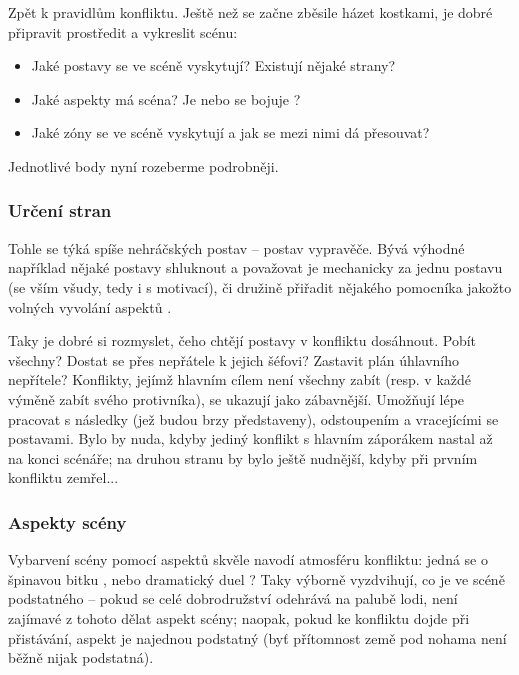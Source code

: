 \documentclass[../main.tex]{subfiles}
\begin{document}
Zpět k pravidlům konfliktu. Ještě než se začne zběsile házet kostkami, je dobré připravit
prostředit a vykreslit scénu:

\begin{itemize}
  \item Jaké postavy se ve scéně vyskytují? Existují nějaké strany?
  \item Jaké aspekty má scéna? Je  nebo se bojuje
    ?
  \item Jaké zóny se ve scéně vyskytují a jak se mezi nimi dá přesouvat?
\end{itemize}

Jednotlivé body nyní rozeberme podrobněji.

\subsubsection{Určení stran}
\label{sec:urcenistran}
Tohle se týká spíše nehráčských postav – postav vypravěče. Bývá výhodné například nějaké
postavy shluknout a považovat je mechanicky za jednu postavu (se vším všudy, tedy i s
motivací), či družině přiřadit nějakého pomocníka jakožto volných vyvolání aspektů .

Taky je dobré si rozmyslet, čeho chtějí postavy v konfliktu dosáhnout. Pobít všechny?
Dostat se přes nepřátele k jejich šéfovi? Zastavit plán úhlavního nepřítele? Konflikty,
jejímž hlavním cílem není všechny zabít (resp. v každé výměně zabít svého protivníka), se
ukazují jako zábavnější. Umožňují lépe pracovat s následky (jež budou brzy představeny),
odstoupením a vracejícími se postavami. Bylo by nuda, kdyby jediný konflikt s hlavním
záporákem nastal až na konci scénáře; na druhou stranu by bylo ještě nudnější, kdyby při
prvním konfliktu zemřel...

\subsubsection{Aspekty scény}
\label{sec:aspektysceny}

Vybarvení scény pomocí aspektů skvěle navodí atmosféru konfliktu: jedná se o špinavou
bitku , nebo dramatický duel ? Taky výborně
vyzdvihují, co je ve scéně podstatného – pokud se celé dobrodružství odehrává na palubě
lodi, není zajímavé z tohoto dělat aspekt scény; naopak, pokud ke konfliktu dojde při
přistávání, aspekt  je najednou podstatný (byť přítomnost země pod
nohama není běžně nijak podstatná).
\end{document}
